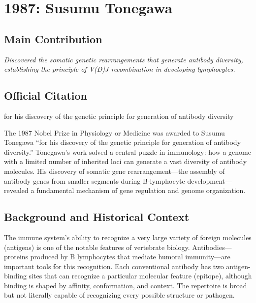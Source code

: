\chapter[1987 --- Tonegawa]{1987: Susumu Tonegawa}
\label{ch:1987_susumutonegawa}

\section*{Main Contribution}

\textit{Discovered the somatic genetic rearrangements that generate antibody diversity, establishing the principle of V(D)J recombination in developing lymphocytes.}\cite{nobel-1987,lecture-1987}

\section{Official Citation}

for his discovery of the genetic principle for generation of antibody diversity

The 1987 Nobel Prize in Physiology or Medicine was awarded to Susumu Tonegawa ``for his discovery of the genetic principle for generation of antibody diversity.'' Tonegawa's work solved a central puzzle in immunology: how a genome with a limited number of inherited loci can generate a vast diversity of antibody molecules. His discovery of somatic gene rearrangement---the assembly of antibody genes from smaller segments during B-lymphocyte development---revealed a fundamental mechanism of gene regulation and genome organization.

\section{Background and Historical Context}

The immune system's ability to recognize a very large variety of foreign molecules (antigens) is one of the notable features of vertebrate biology. Antibodies---proteins produced by B lymphocytes that mediate humoral immunity---are important tools for this recognition. Each conventional antibody has two antigen-binding sites that can recognize a particular molecular feature (epitope), although binding is shaped by affinity, conformation, and context. The repertoire is broad but not literally capable of recognizing every possible structure or pathogen.


